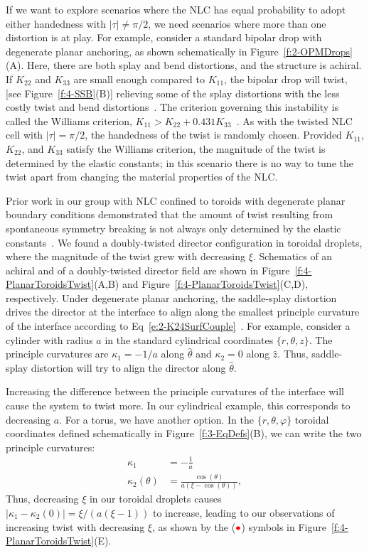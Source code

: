 If we want to explore scenarios where the NLC has equal probability to adopt either handedness with $|\tau| \neq \pi/2$, we need scenarios where more than one distortion is at play.
For example, consider a standard bipolar drop with degenerate planar anchoring, as shown schematically in Figure~\ref{f:2-OPMDrops}(A).
Here, there are both splay and bend distortions, and the structure is achiral.
If $K_{22}$ and $K_{33}$ are small enough compared to $K_{11}$, the bipolar drop will twist, [see Figure~\ref{f:4-SSB}(B)] relieving some of the splay distortions with the less costly twist and bend distortions~\cite{RN297,RN296,RN295}.
The criterion governing this instability is called the Williams criterion, $K_{11} > K_{22}+ 0.431 K_{33}$~\cite{RN297, williamsCrit}.
As with the twisted NLC cell with $|\tau| = \pi/2$, the handedness of the twist is randomly chosen.
Provided $K_{11}$, $K_{22}$, and $K_{33}$ satisfy the Williams criterion, the magnitude of the twist is determined by the elastic constants; in this scenario there is no way to tune the twist apart from changing the material properties of the NLC.

Prior work in our group with NLC confined to toroids with degenerate planar boundary conditions demonstrated that the amount of twist resulting from spontaneous symmetry breaking is not always only determined by the elastic constants~\cite{RN24}.
We found a doubly-twisted director configuration in toroidal droplets, where the magnitude of the twist grew with decreasing $\xi$.
Schematics of an achiral and of a doubly-twisted director field are shown in Figure~\ref{f:4-PlanarToroidsTwist}(A,B) and Figure~\ref{f:4-PlanarToroidsTwist}(C,D), respectively.
Under degenerate planar anchoring, the saddle-splay distortion drives the director at the interface to align along the smallest principle curvature of the interface according to Eq~\ref{e:2-K24SurfCouple}~\cite{RN59}.
For example, consider a cylinder with radius $a$ in the standard cylindrical coordinates $\{r, \theta, z \}$.
The principle curvatures are $\kappa_1 = -1/a$ along $\hat{\theta}$ and $\kappa_2 = 0$ along $\hat{z}$.
Thus, saddle-splay distortion will try to align the director along $\hat{\theta}$.

Increasing the difference between the principle curvatures of the interface will cause the system to twist more.
In our cylindrical example, this corresponds to decreasing $a$.
For a torus, we have another option.
In the $\{r, \theta, \varphi\}$ toroidal coordinates defined schematically in Figure~\ref{f:3-EqDefs}(B), we can write the two principle curvatures:
\begin{align}
  \kappa_1 &= -\frac{1}{a} \\
  \kappa_2(\theta) &= \frac{\cos(\theta)}{a(\xi-\cos(\theta))},
\end{align}
Thus, decreasing $\xi$ in our toroidal droplets causes $|\kappa_1-\kappa_2(0)| = \xi/(a(\xi-1))$ to increase, leading to our observations of increasing twist with decreasing $\xi$, as shown by the (${\color{red} \bullet}$) symbols in Figure~\ref{f:4-PlanarToroidsTwist}(E).

